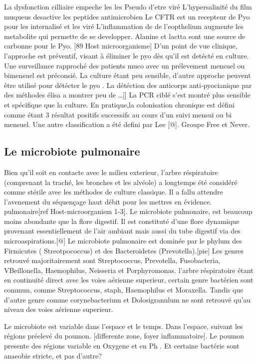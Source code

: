 \documentclass[12pt,a4paper]{article}
\begin{document}
La dysfonction cilliaire empeche les les Pseudo d’etre viré
L’hypersalinité du film muqueus desactive les peptides antimicrobien
Le CFTR est un recepteur de Pyo pour les internalisé et les viré
L’inflammation de de l’eopthelium augmente les metabolite qui permette de se developper.
Alanine et lactta sont une source de carbonne pour le Pyo. [89 Host microorganisme]
D’un point de vue clinique, l’approche est préventif, visant à éliminer le pyo dès qu’il est detécté en culture. Une surveillance rapproché des patients muco avec un prélevement mensuel ou bimensuel est préconsié. La culture étant peu sensible, d’autre approche peuvent être utilisé pour détécter le pyo . La détéction des anticorps anti-pyocianique par des méthodes élisa a montrer peu de …[]
La PCR ciblé s’est montré plus sensible et spécifique que la culture.
En pratique,la colonisation chronique est défini comme étant 3 résultat positifs successifs au cours d’un suivi mensui ou bi mensuel.
Une autre classification a été defini par Lee [@]. Groupe Free et Never.

\subsection{Le microbiote pulmonaire}

Bien qu’il soit en contacte avec le milieu exterieur, l’arbre réspiratoire (comprenant la traché, les bronches et les alvéole) a longtemps été considéré comme stérile avec les méthodes de culture classique. Il a fallu attendre l’avenement du séquençage haut débit pour les mettres en évidence. pulmonaire[ref Host-microorganism 1-3].
Le microbiote pulmonaire, est beaucoup moins abondante que la flore digestif. Il est constituté d’une flore dynamique provenant essentiellement de l’air ambiant mais aussi du tube digestif via des microaspirations.[@]
Le microbiote pulmonaire est dominée par le phylum des Firmicutes ( Streotpococcus) et des Bacteroidetes (Prevotella).[pie] Les genres retrouvé majoritairement sont Streptococcus, Prevotella, Fusobacteria, VBeillonella, Haemophilus, Neisseria et Porphyromonas.
l’arbre réspiratoire étant en continuité direct avec les voies aérienne superieur, certain genre bactérien sont commun, comme Streptococcus, staph, Haemophilus et Moraxella. Tandis que d’autre genre comme corynebacterium et Dolosigranulum ne sont retrouvé qu’au niveau des voies aérienne superieur.

Le microbiote est variable dans l’espace et le temps.
Dans l’espace, suivant les régions préelevé du poumon. [differente zone, foyer inflammatoire]. Le poumon presente des régions variable en Oxygene et en Ph . Et certaine bactérie sont anaeobie stricte, et pas d’autre?
\end{document}
